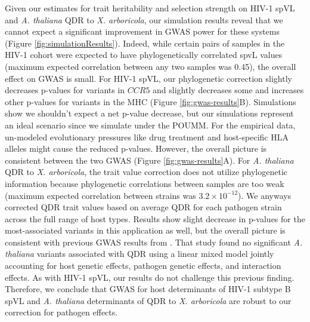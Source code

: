 \documentclass[11pt]{article}
\begin{document}
\begin{linenumbers}
Given our estimates for trait heritability and selection strength on HIV-1 spVL and \emph{A. thaliana} QDR to \emph{X. arboricola}, our simulation results reveal that we cannot expect a significant improvement in GWAS power for these systems (Figure \ref{fig:simulationResults}). Indeed, while certain pairs of samples in the HIV-1 cohort were expected to have phylogenetically correlated spvL values (maximum expected correlation between any two samples was 0.45), the overall effect on GWAS is small. For HIV-1 spVL, our phylogenetic correction slightly decreases p-values for variants in $CCR5$ and slightly decreases some and increases other p-values for variants in the MHC (Figure \ref{fig:gwas-results}B). Simulations show we shouldn't expect a net p-value decrease, but our simulations represent an ideal scenario since we simulate under the POUMM. For the empirical data, un-modeled evolutionary pressures like drug treatment and host-specific HLA alleles might cause the reduced p-values. However, the overall picture is consistent between the two GWAS (Figure \ref{fig:gwas-results}A). For \emph{A. thaliana} QDR to \emph{X. arboricola}, the trait value correction does not utilize phylogenetic information because phylogenetic correlations between samples are too weak (maximum expected correlation between strains was $3.2 \times 10^{-12}$). We anyways corrected QDR trait values based on average QDR for each pathogen strain across the full range of host types. Results show slight decrease in p-values for the most-associated variants in this application as well, but the overall picture is consistent with previous GWAS results from \cite{Wang2018Two-wayGenomes}. That study found no significant \emph{A. thaliana} variants associated with QDR using a linear mixed model jointly accounting for host genetic effects, pathogen genetic effects, and interaction effects. As with HIV-1 spVL, our results do not challenge this previous finding. Therefore, we conclude that GWAS for host determinants of HIV-1 subtype B spVL and \emph{A. thaliana} determinants of QDR to \emph{X. arboricola} are robust to our correction for pathogen effects.


\end{linenumbers}
\end{document}
